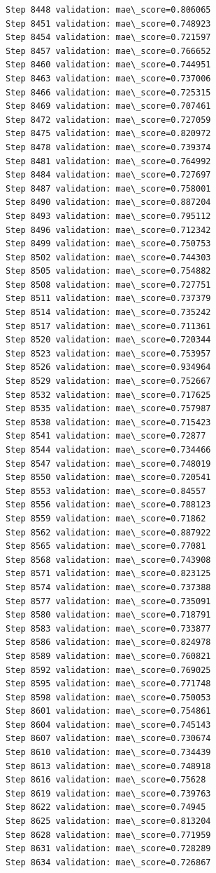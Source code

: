 \documentclass[11pt]{article}
\begin{document}
\begin{Verbatim}[commandchars=\\\{\}]
Step 8448 validation: mae\_score=0.806065
Step 8451 validation: mae\_score=0.748923
Step 8454 validation: mae\_score=0.721597
Step 8457 validation: mae\_score=0.766652
Step 8460 validation: mae\_score=0.744951
Step 8463 validation: mae\_score=0.737006
Step 8466 validation: mae\_score=0.725315
Step 8469 validation: mae\_score=0.707461
Step 8472 validation: mae\_score=0.727059
Step 8475 validation: mae\_score=0.820972
Step 8478 validation: mae\_score=0.739374
Step 8481 validation: mae\_score=0.764992
Step 8484 validation: mae\_score=0.727697
Step 8487 validation: mae\_score=0.758001
Step 8490 validation: mae\_score=0.887204
Step 8493 validation: mae\_score=0.795112
Step 8496 validation: mae\_score=0.712342
Step 8499 validation: mae\_score=0.750753
Step 8502 validation: mae\_score=0.744303
Step 8505 validation: mae\_score=0.754882
Step 8508 validation: mae\_score=0.727751
Step 8511 validation: mae\_score=0.737379
Step 8514 validation: mae\_score=0.735242
Step 8517 validation: mae\_score=0.711361
Step 8520 validation: mae\_score=0.720344
Step 8523 validation: mae\_score=0.753957
Step 8526 validation: mae\_score=0.934964
Step 8529 validation: mae\_score=0.752667
Step 8532 validation: mae\_score=0.717625
Step 8535 validation: mae\_score=0.757987
Step 8538 validation: mae\_score=0.715423
Step 8541 validation: mae\_score=0.72877
Step 8544 validation: mae\_score=0.734466
Step 8547 validation: mae\_score=0.748019
Step 8550 validation: mae\_score=0.720541
Step 8553 validation: mae\_score=0.84557
Step 8556 validation: mae\_score=0.788123
Step 8559 validation: mae\_score=0.71862
Step 8562 validation: mae\_score=0.887922
Step 8565 validation: mae\_score=0.77081
Step 8568 validation: mae\_score=0.743908
Step 8571 validation: mae\_score=0.823125
Step 8574 validation: mae\_score=0.737388
Step 8577 validation: mae\_score=0.735091
Step 8580 validation: mae\_score=0.718791
Step 8583 validation: mae\_score=0.733877
Step 8586 validation: mae\_score=0.824978
Step 8589 validation: mae\_score=0.760821
Step 8592 validation: mae\_score=0.769025
Step 8595 validation: mae\_score=0.771748
Step 8598 validation: mae\_score=0.750053
Step 8601 validation: mae\_score=0.754861
Step 8604 validation: mae\_score=0.745143
Step 8607 validation: mae\_score=0.730674
Step 8610 validation: mae\_score=0.734439
Step 8613 validation: mae\_score=0.748918
Step 8616 validation: mae\_score=0.75628
Step 8619 validation: mae\_score=0.739763
Step 8622 validation: mae\_score=0.74945
Step 8625 validation: mae\_score=0.813204
Step 8628 validation: mae\_score=0.771959
Step 8631 validation: mae\_score=0.728289
Step 8634 validation: mae\_score=0.726867

\end{Verbatim}
\end{document}
